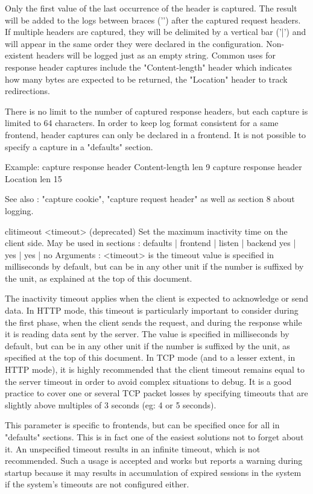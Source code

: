   Only the first value of the last occurrence of the header is captured. The
  result will be added to the logs between braces ('{}') after the captured
  request headers. If multiple headers are captured, they will be delimited by
  a vertical bar ('|') and will appear in the same order they were declared in
  the configuration. Non-existent headers will be logged just as an empty
  string. Common uses for response header captures include the "Content-length"
  header which indicates how many bytes are expected to be returned, the
  "Location" header to track redirections.

  There is no limit to the number of captured response headers, but each
  capture is limited to 64 characters. In order to keep log format consistent
  for a same frontend, header captures can only be declared in a frontend. It
  is not possible to specify a capture in a "defaults" section.

  Example:
        capture response header Content-length len 9
        capture response header Location len 15

  See also : "capture cookie", "capture request header" as well as section 8
             about logging.


clitimeout <timeout> (deprecated)
  Set the maximum inactivity time on the client side.
  May be used in sections :   defaults | frontend | listen | backend
                                 yes   |    yes   |   yes  |   no
  Arguments :
    <timeout> is the timeout value is specified in milliseconds by default, but
              can be in any other unit if the number is suffixed by the unit,
              as explained at the top of this document.

  The inactivity timeout applies when the client is expected to acknowledge or
  send data. In HTTP mode, this timeout is particularly important to consider
  during the first phase, when the client sends the request, and during the
  response while it is reading data sent by the server. The value is specified
  in milliseconds by default, but can be in any other unit if the number is
  suffixed by the unit, as specified at the top of this document. In TCP mode
  (and to a lesser extent, in HTTP mode), it is highly recommended that the
  client timeout remains equal to the server timeout in order to avoid complex
  situations to debug. It is a good practice to cover one or several TCP packet
  losses by specifying timeouts that are slightly above multiples of 3 seconds
  (eg: 4 or 5 seconds).

  This parameter is specific to frontends, but can be specified once for all in
  "defaults" sections. This is in fact one of the easiest solutions not to
  forget about it. An unspecified timeout results in an infinite timeout, which
  is not recommended. Such a usage is accepted and works but reports a warning
  during startup because it may results in accumulation of expired sessions in
  the system if the system's timeouts are not configured either.

